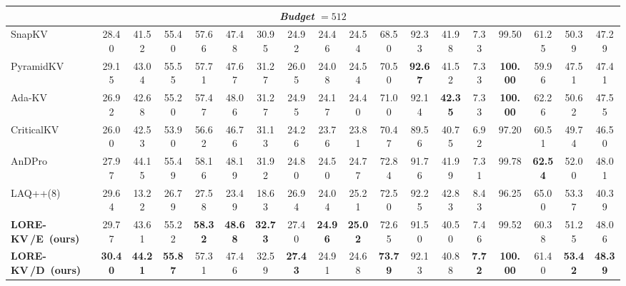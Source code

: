 \documentclass{article} %
\newcommand{\best}[1]{\textcolor{bestblue}{\textbf{#1}}}
\newcommand{\second}[1]{\textcolor{secondorange}{#1}}
\newcommand{\lorekvE}{LORE-KV\,/E}
\newcommand{\lorekvD}{LORE-KV\,/D}
\begin{document}
\begin{table}[t]
{\begin{tabular}{lccccccccccccccccc}
\midrule
\multicolumn{18}{c}{\textit{Budget} $=512$} \\
\midrule
SnapKV & 28.40 & 41.52 & 55.40 & 57.66 & 47.48 & 30.95 & 24.92 & 24.46 & 24.54 & 68.50 & \second{92.33} & 41.98 & 7.33 & 99.50 & 61.25 & 50.39 & 47.29 \\
PyramidKV & 29.15 & 43.04 & \second{55.55} & 57.71 & 47.67 & 31.27 & 26.05 & 24.08 & 24.54 & 70.50 & \best{92.67} & 41.52 & 7.33 & \best{100.00} & 59.96 & 47.51 & 47.41 \\
Ada-KV & 26.92 & 42.68 & 55.20 & 57.47 & 48.06 & 31.27 & 24.95 & 24.17 & 24.40 & 71.00 & 92.14 & \best{42.35} & 7.33 & \best{100.00} & \second{62.26} & 50.62 & 47.55 \\
CriticalKV & 26.00 & 42.53 & 53.90 & 56.62 & 46.76 & 31.13 & 24.26 & 23.76 & 23.81 & 70.47 & 89.56 & 40.75 & 6.92 & 97.20 & 60.51 & 49.74 & 46.50 \\
AnDPro & 27.97 & \second{44.15} & 55.49 & \second{58.16} & \second{48.19} & 31.92 & 24.80 & 24.50 & \second{24.77} & \second{72.84} & 91.76 & \second{41.99} & 7.31 & \second{99.78} & \best{62.54} & \second{52.00} & 48.01 \\
LAQ++(8) \citep{wang2025lookahead} & 29.64 & 13.22 & 26.79 & 27.58 & 23.49 & 18.63 & 26.94 & 24.04 & 25.21 & 72.50 & 92.25 & 42.83 & 8.43 & 96.25 & 65.00 & 53.37 & 40.39 \\
\textbf{\lorekvE\ (ours)} & \second{29.77} & 43.61 & 55.22 & \best{58.32} & \best{48.68} & \best{32.73} & \second{27.40} & \best{24.96} & \best{25.02} & 72.65 & 91.50 & 40.50 & \second{7.46} & 99.52 & 60.38 & 51.25 & \second{48.06} \\
\textbf{\lorekvD\ (ours)} & \best{30.40} & \best{44.21} & \best{55.87} & 57.31 & 47.46 & \second{32.59} & \best{27.43} & \second{24.91} & 24.68 & \best{73.79} & 92.13 & 40.88 & \best{7.72} & \best{100.00} & 61.40 & \best{53.42} & \best{48.39} \\


\end{tabular}}
\end{table}
\end{document}
